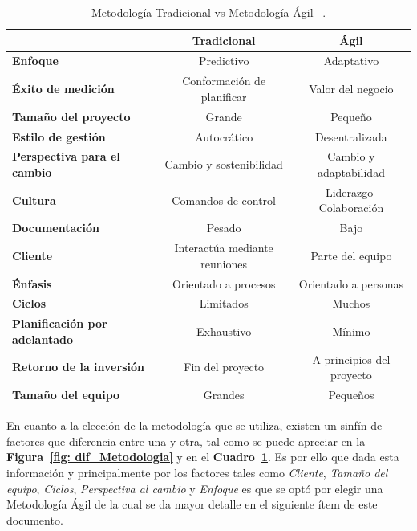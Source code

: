 \begin{table}[htb]
    
    \caption{\label{tab: tab_dif_Metodologia} Metodología Tradicional vs Metodología Ágil ~\cite{17}. }
    \footnotesize
    \begin{tabular}{| l || c | c |}
    
    \hline
      & \textbf{Tradicional} & \textbf{Ágil} \\
    
    \hline\hline
    
    \textbf{Enfoque} & Predictivo & Adaptativo\\ \hline

    \textbf{Éxito de medición}   & Conformación de planificar & Valor del negocio\\ \hline

    \textbf{Tamaño del proyecto} & Grande & Pequeño\\ \hline

    \textbf{Estilo de gestión} & Autocrático & Desentralizada \\ \hline

    \textbf{Perspectiva para el cambio} & Cambio y sostenibilidad & Cambio y adaptabilidad\\ \hline

    \textbf{Cultura} & Comandos de control & Liderazgo-Colaboración\\ \hline

    \textbf{Documentación} & Pesado & Bajo\\ \hline

    \textbf{Cliente} & Interactúa mediante reuniones & Parte del equipo\\ \hline

    \textbf{Énfasis} & Orientado a procesos & Orientado a personas\\ \hline
    
    \textbf{Ciclos} & Limitados & Muchos\\ \hline
    
    \textbf{Planificación por adelantado} & Exhaustivo & Mínimo\\ \hline
    
    \textbf{Retorno de la inversión} & Fin del proyecto & A principios del proyecto\\ \hline

    \textbf{Tamaño del equipo} & Grandes & Pequeños\\ \hline
    \end{tabular}  
\end{table}

En cuanto a la elección de la metodología que se utiliza, existen un sinfín de factores que diferencia entre una y otra, tal como se puede apreciar en la \textbf{Figura~\ref{fig: dif_Metodologia}}  y en el \textbf{Cuadro~\ref{tab: tab_dif_Metodologia}}. Es por ello que dada esta información y principalmente por los factores tales como \emph{Cliente}, \emph{Tamaño del equipo}, \emph{Ciclos}, \emph{Perspectiva al cambio} y \emph{Enfoque} es que se optó por elegir una Metodología Ágil de la cual se da mayor detalle en el siguiente ítem de este documento.